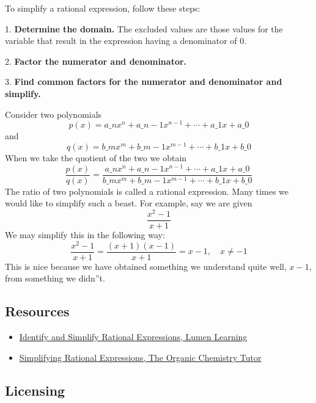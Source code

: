 To simplify a rational expression, follow these steps:

1. \textbf{Determine the domain.} The excluded values are those values for the variable that result in the expression having a denominator of $0$.

2. \textbf{Factor the numerator and denominator.}

3. \textbf{Find common factors for the numerator and denominator and simplify.}

Consider two polynomials
\[
p(x) = a\_n x^n + a\_{n-1} x^{n-1} + \cdots + a\_1 x + a\_0
\]
and
\[
q(x) = b\_m x^m + b\_{m-1} x^{m-1} + \cdots + b\_1 x + b\_0
\]
When we take the quotient of the two we obtain
\[
\frac{p(x)}{q(x)} = \frac{a\_n x^n + a\_{n-1} x^{n-1} + \cdots + a\_1 x + a\_0}{b\_m x^m + b\_{m-1} x^{m-1} + \cdots + b\_1 x + b\_0}
\]
The ratio of two polynomials is called a rational expression. Many times we would like to
simplify such a beast. For example, say we are given
\[
\frac{x^2 - 1}{x + 1}
\]
We may simplify this in the following way:
\[
\frac{x^2 - 1}{x + 1} = \frac{(x + 1)(x - 1)}{x + 1} = x - 1, \quad x \neq -1
\]
This is nice because we have obtained something we understand quite well, $x - 1$, from something we didn''t.

\subsection{Resources}
\label{sss:reso-55b5}

\begin{itemize}
    \item \href{https://courses.lumenlearning.com/beginalgebra/chapter/6-1-1-introduction-to-rational-expressions/}{Identify and Simplify Rational Expressions, Lumen Learning}
    \item \href{https://www.youtube.com/watch?v=uVpsz-xpnPo}{Simplifying Rational Expressions, The Organic Chemistry Tutor}
\end{itemize}

\subsection{Licensing}
\label{sss:lice-7352}


